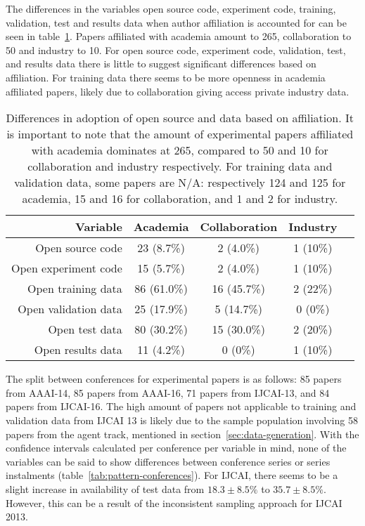 The differences in the variables open source code, experiment code, training, validation, test and results data when author affiliation is accounted for can be seen in table~\ref{tab:affiliation}. Papers affiliated with academia amount to 265, collaboration to 50 and industry to 10. For open source code, experiment code, validation, test, and results data there is little to suggest significant differences based on affiliation. For training data there seems to be more openness in academia affiliated papers, likely due to collaboration giving access private industry data.

\begin{table}[!htb]
\begin{center}
    \begin{tabular}{ r|cccc }
    \textbf{Variable} & \textbf{Academia} & \textbf{Collaboration} & \textbf{Industry} \\ \hline
    Open source code & 23 (8.7\%) & 2 (4.0\%) & 1 (10\%) \\
    Open experiment code & 15 (5.7\%) & 2 (4.0\%) & 1 (10\%) \\
    Open training data & 86 (61.0\%) & 16 (45.7\%) & 2 (22\%) \\
    Open validation data & 25 (17.9\%) & 5 (14.7\%) & 0 (0\%) \\
    Open test data & 80 (30.2\%) & 15 (30.0\%) & 2 (20\%) \\
    Open results data & 11 (4.2\%) & 0 (0\%) & 1 (10\%) \\
    \end{tabular}
\end{center}
\caption[Open source and data compared to affiliation.]{Differences in adoption of open source and data based on affiliation. It is important to note that the amount of experimental papers affiliated with academia dominates at 265, compared to 50 and 10 for collaboration and industry respectively. For training data and validation data, some papers are N/A: respectively 124 and 125 for academia, 15 and 16 for collaboration, and 1 and 2 for industry.}
\label{tab:affiliation}
\end{table}

The split between conferences for experimental papers is as follows: 85 papers from AAAI-14, 85 papers from AAAI-16, 71 papers from IJCAI-13, and 84 papers from IJCAI-16. The high amount of papers not applicable to training and validation data from IJCAI 13 is likely due to the sample population involving 58 papers from the agent track, mentioned in section~\ref{sec:data-generation}. With the confidence intervals calculated per conference per variable in mind, none of the variables can be said to show differences between conference series or series instalments (table~\ref{tab:pattern-conferences}). For IJCAI, there seems to be a slight increase in availability of test data from $18.3\pm8.5\%$ to $35.7\pm8.5\%$. However, this can be a result of the inconsistent sampling approach for IJCAI 2013.

